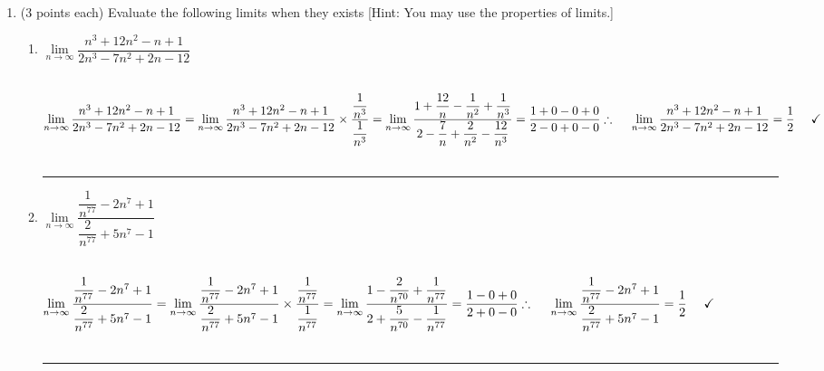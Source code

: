 \documentclass[fleqn]{article}
\begin{document}
\begin{enumerate}
    \item (3 points each) Evaluate the following limits when they exists [Hint: You may use the
    properties of limits.]
    \begin{enumerate}
      \item $\lim\limits_{n\to\infty} \dfrac{n^3+12n^2-n+1}{2n^3-7n^2+2n-12}$

        \textcolor{hwColor}{
          \\
          $
            \lim\limits_{n\to\infty} \dfrac{n^3+12n^2-n+1}{2n^3-7n^2+2n-12}
            =\lim\limits_{n\to\infty} \dfrac{n^3+12n^2-n+1}{2n^3-7n^2+2n-12} \times \dfrac{\dfrac{1}{n^3}}{\dfrac{1}{n^3}}
            \\
            \\
            \\
            =\lim\limits_{n\to\infty} \dfrac{1+\dfrac{12}{n}-\dfrac{1}{n^2}+\dfrac{1}{n^3}}{2-\dfrac{7}{n}+\dfrac{2}{n^2}-\dfrac{12}{n^3}}=\dfrac{1+0-0+0}{2-0+0-0}
            \\
            \\
            \\
            \therefore ~~~~ \lim\limits_{n\to\infty} \dfrac{n^3+12n^2-n+1}{2n^3-7n^2+2n-12}=\dfrac{1}{2} ~~~~ \checkmark
          $
          \\
          \\
          \rule{15cm}{2pt}
        }

      \item $\lim\limits_{n\to\infty} \dfrac{\dfrac{1}{n^{77}}-2n^7+1}{\dfrac{2}{n^{77}}+5n^7-1}$
    
        \textcolor{hwColor}{
          \\
          $
            \lim\limits_{n\to\infty} \dfrac{\dfrac{1}{n^{77}}-2n^7+1}{\dfrac{2}{n^{77}}+5n^7-1}
            =\lim\limits_{n\to\infty} \dfrac{\dfrac{1}{n^{77}}-2n^7+1}{\dfrac{2}{n^{77}}+5n^7-1} \times \dfrac{\dfrac{1}{n^{77}}}{\dfrac{1}{n^{77}}}
            \\
            \\
            \\
            =\lim\limits_{n\to\infty} \dfrac{1-\dfrac{2}{n^{70}}+\dfrac{1}{n^{77}}}{2+\dfrac{5}{n^{70}}-\dfrac{1}{n^{77}}}=\dfrac{1-0+0}{2+0-0}
            \\
            \\
            \\
            \therefore ~~~~ \lim\limits_{n\to\infty} \dfrac{\dfrac{1}{n^{77}}-2n^7+1}{\dfrac{2}{n^{77}}+5n^7-1}=\dfrac{1}{2} ~~~~ \checkmark
          $
          \\
          \\
          \rule{15cm}{2pt}
        }


\end{enumerate}
\end{enumerate}
\end{document}
